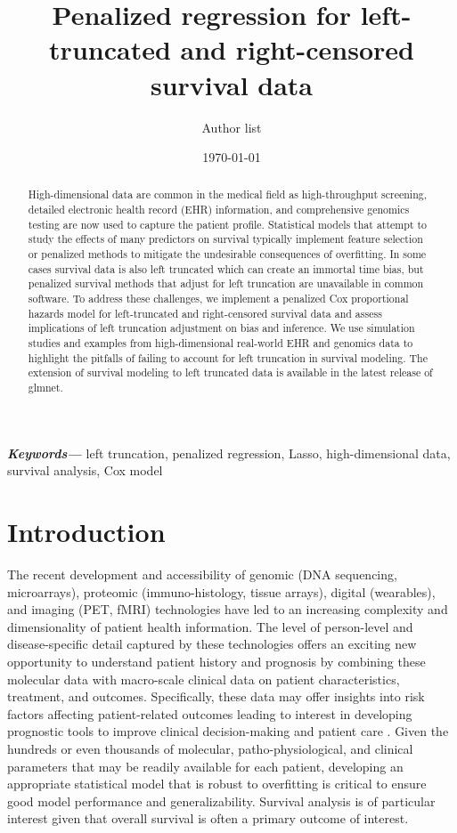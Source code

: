 \documentclass[11pt,final,fleqn]{article}\usepackage[]{graphicx}\usepackage[]{color}
\title{Penalized regression for left-truncated and right-censored survival data}
\author{Author list}
\date{\today}
\theoremstyle{plain}
\newcommand{\pkg}[1]{{\fontseries{b}\selectfont #1}}
\providecommand{\keywords}[1]
{
  \small	
  \textbf{\textit{Keywords---}} #1
}
\begin{document}
\maketitle

\begin{abstract}
    High-dimensional data are common in the medical field as high-throughput screening, detailed electronic health record (EHR) information, and comprehensive genomics testing are now used to capture the patient profile. Statistical models that attempt to study the effects of many predictors on survival typically implement feature selection or penalized methods to mitigate the undesirable consequences of overfitting. In some cases survival data is also left truncated which can create an immortal time bias, but penalized survival methods that adjust for left truncation are unavailable in common software. To address these challenges, we implement a penalized Cox proportional hazards model for left-truncated and right-censored survival data and assess implications of left truncation adjustment on bias and inference. We use simulation studies and examples from high-dimensional real-world EHR and genomics data to highlight the pitfalls of failing to account for left truncation in survival modeling. The extension of survival modeling to left truncated data is available in the latest release of \pkg{glmnet}.
\end{abstract}

\keywords{left truncation, penalized regression, Lasso, high-dimensional data, survival analysis, Cox model}

\section{Introduction}
The recent development and accessibility of genomic (DNA sequencing, microarrays), proteomic (immuno-histology, tissue arrays), digital (wearables), and imaging (PET, fMRI) technologies have led to an increasing complexity and dimensionality of patient health information. The level of person-level and disease-specific detail captured by these technologies offers an exciting new opportunity to understand patient history and prognosis by combining these molecular data with macro-scale clinical data on patient characteristics, treatment, and outcomes. Specifically, these data may offer insights into risk factors affecting patient-related outcomes leading to interest in developing prognostic tools to improve clinical decision-making and patient care \citep{gui2005penalized, wishart2010predict, ow2016big, yousefi2017predicting}. Given the hundreds or even thousands of molecular, patho-physiological, and clinical parameters that may be readily available for each patient, developing an appropriate statistical model that is robust to overfitting is critical to ensure good model performance and generalizability. Survival analysis is of particular interest given that overall survival is often a primary outcome of interest.  
\end{document}
